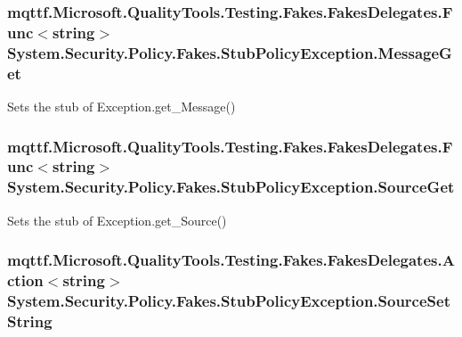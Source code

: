 \hypertarget{class_system_1_1_security_1_1_policy_1_1_fakes_1_1_stub_policy_exception_afb33b3e828d59be976731895da345aae}{
\subsubsection[{Message\-Get}]{\setlength{\rightskip}{0pt plus 5cm}mqttf.\-Microsoft.\-Quality\-Tools.\-Testing.\-Fakes.\-Fakes\-Delegates.\-Func$<$string$>$ System.\-Security.\-Policy.\-Fakes.\-Stub\-Policy\-Exception.\-Message\-Get}}\label{class_system_1_1_security_1_1_policy_1_1_fakes_1_1_stub_policy_exception_afb33b3e828d59be976731895da345aae}


Sets the stub of Exception.\-get\-\_\-\-Message()

\hypertarget{class_system_1_1_security_1_1_policy_1_1_fakes_1_1_stub_policy_exception_a7448cb150bd82d07a5aac2e7ad9d705d}{
\subsubsection[{Source\-Get}]{\setlength{\rightskip}{0pt plus 5cm}mqttf.\-Microsoft.\-Quality\-Tools.\-Testing.\-Fakes.\-Fakes\-Delegates.\-Func$<$string$>$ System.\-Security.\-Policy.\-Fakes.\-Stub\-Policy\-Exception.\-Source\-Get}}\label{class_system_1_1_security_1_1_policy_1_1_fakes_1_1_stub_policy_exception_a7448cb150bd82d07a5aac2e7ad9d705d}


Sets the stub of Exception.\-get\-\_\-\-Source()

\hypertarget{class_system_1_1_security_1_1_policy_1_1_fakes_1_1_stub_policy_exception_aec4309b86b166f9e97c1b7ab1c355ef9}{
\subsubsection[{Source\-Set\-String}]{\setlength{\rightskip}{0pt plus 5cm}mqttf.\-Microsoft.\-Quality\-Tools.\-Testing.\-Fakes.\-Fakes\-Delegates.\-Action$<$string$>$ System.\-Security.\-Policy.\-Fakes.\-Stub\-Policy\-Exception.\-Source\-Set\-String}}\label{class_system_1_1_security_1_1_policy_1_1_fakes_1_1_stub_policy_exception_aec4309b86b166f9e97c1b7ab1c355ef9}


